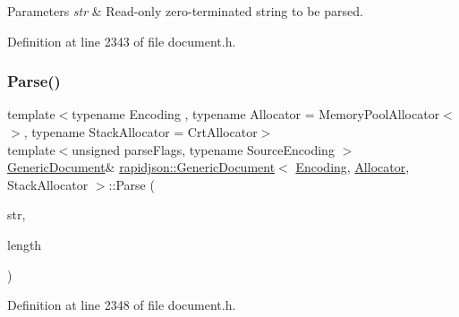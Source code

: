 \begin{DoxyParams}{Parameters}
{\em str} & Read-\/only zero-\/terminated string to be parsed. \\
\hline
\end{DoxyParams}


Definition at line 2343 of file document.\+h.


\begin{DoxyCode}{0}

\end{DoxyCode}
\mbox{\label{classrapidjson_1_1_generic_document_ab5b308584e4bea9f59e0ba32ebd22b16}} 
\subsubsection{\texorpdfstring{Parse()}{Parse()}\hspace{0.1cm}{\footnotesize\ttfamily [4/6]}}
{\footnotesize\ttfamily template$<$typename Encoding , typename Allocator  = Memory\+Pool\+Allocator$<$$>$, typename Stack\+Allocator  = Crt\+Allocator$>$ \\
template$<$unsigned parse\+Flags, typename Source\+Encoding $>$ \\
\mbox{\hyperlink{classrapidjson_1_1_generic_document}{Generic\+Document}}\& \mbox{\hyperlink{classrapidjson_1_1_generic_document}{rapidjson\+::\+Generic\+Document}}$<$ \mbox{\hyperlink{classrapidjson_1_1_encoding}{Encoding}}, \mbox{\hyperlink{classrapidjson_1_1_allocator}{Allocator}}, Stack\+Allocator $>$\+::Parse (\begin{DoxyParamCaption}\item[{const typename Source\+Encoding\+::\+Ch $\ast$}]{str,  }\item[{size\+\_\+t}]{length }\end{DoxyParamCaption})}



Definition at line 2348 of file document.\+h.


